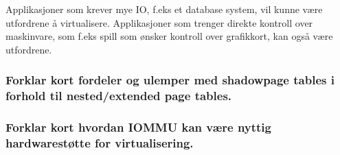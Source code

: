 \documentclass[9pt]{article}
\begin{document}
Applikasjoner som krever mye IO, f.eks et database system, vil kunne være utfordrene å virtualisere. Applikasjoner som trenger direkte kontroll over maskinvare, som f.eks spill som ønsker kontroll over grafikkort, kan også være utfordrene. 

\subsubsection{Forklar kort fordeler og ulemper med shadowpage tables i forhold til nested/extended page tables.}



\subsubsection{Forklar kort hvordan IOMMU kan være nyttig hardwarestøtte for virtualisering.}
\end{document}
